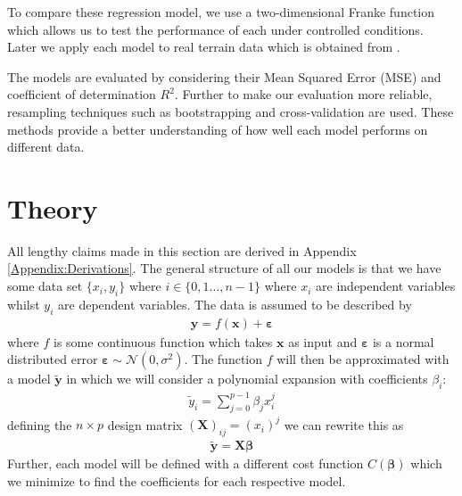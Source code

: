 \documentclass[%
reprint,
amsmath,amssymb,
aps,
pra,
]{revtex4-2}
\begin{document}
To compare these regression model, we use a two-dimensional Franke function which allows us to test the performance of each under controlled conditions. Later we apply each model to real terrain data which is obtained from \cite{USGS_EarthExplorer}.

The models are evaluated by considering their Mean Squared Error (MSE) and coefficient of determination $R^2$. Further to make our evaluation more reliable, resampling techniques such as bootstrapping and cross-validation are used. These methods provide a better understanding of how well each model performs on different data.

\section{Theory}
All lengthy claims made in this section are derived in Appendix \ref{Appendix:Derivations}. The general structure of all our models is that we have some data set $\{x_i,y_i\}$ where $i\in\{0,1...,n-1\}$ where $x_i$ are independent variables whilst $y_i$ are dependent variables. The data is assumed to be described by
\begin{align}
	\bm y=f(\bm x)+\bm \varepsilon
	\label{eq:data}
\end{align}
where $f$ is some continuous function which takes $\bm x$ as input and $\bm\varepsilon$ is a normal distributed error $\bm\varepsilon\sim\mathcal{N}(0,\sigma^2)$. The function $f$ will then be approximated with a model $\tilde{\bm y}$ in which we will consider a polynomial expansion with coefficients $\beta_i$:
\begin{align}
	\tilde{y}_i=\sum_{j=0}^{p-1}\beta_j x_i^j
\end{align}
defining the $n\times p$ design matrix $(\bm X)_{ij}=(x_i)^j$ we can rewrite this as
\begin{align}
	\tilde{\bm y}=\bm X\bm\beta
\end{align}
Further, each model will be defined with a different cost function $C(\bm\beta)$ which we minimize to find the coefficients for each respective model.
\end{document}
